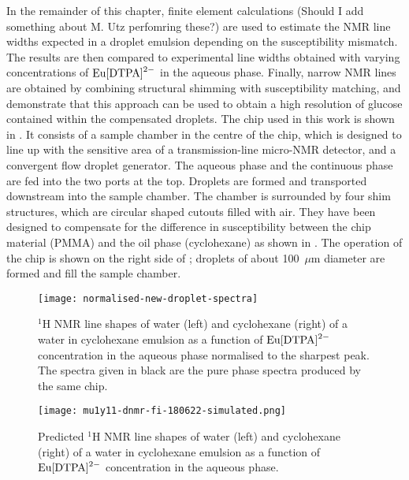 In the remainder of this chapter,
finite element calculations (Should I add something about M. Utz perfomring these?) are used to estimate
the NMR line widths expected in a droplet emulsion
depending on the susceptibility mismatch.
The results are then compared to experimental
line widths obtained with varying concentrations
of $\ce{Eu[DTPA]^{2-}}$ in the aqueous phase. Finally,
 narrow NMR lines are obtained by
combining structural shimming\citep{Ryan:2014hl} with
susceptibility matching, and demonstrate that this
approach can be used to obtain a high resolution of glucose contained within the compensated droplets.
The chip used in this work is shown in . It consists of a sample
chamber in the centre of the chip, which is designed to line up with
the sensitive area of a transmission-line
micro-NMR detector,\citep{Finch:2016gv} and a convergent flow droplet
generator. The aqueous phase and the continuous
phase are fed into the two ports at the top. Droplets are
formed and transported downstream into the sample chamber.
 The chamber is surrounded by four shim structures, which are circular
 shaped cutouts filled with air. They have been designed to compensate
 for the difference in susceptibility between the chip material (PMMA)
 and the oil phase (cyclohexane) as shown in . The operation of the chip is shown
 on the right side of ; droplets of about 100~$\mu$m diameter are formed and
 fill the sample chamber.



\begin{figure}
  \begin{center}
    \texttt{[image: normalised-new-droplet-spectra]}
  \end{center}
  \caption{$^1$H NMR line shapes of water (left) and cyclohexane (right) of a
  water in cyclohexane emulsion as a function of $\ce{Eu[DTPA]^{2-}}$ concentration
  in the aqueous phase normalised to the sharpest peak. The spectra given in black are the pure phase spectra produced by the same chip.
  }
  \label{fig:droplet-spectra}
\end{figure}


\begin{figure}
  \begin{center}
    \texttt{[image: mu1y11-dnmr-fi-180622-simulated.png]}
  \end{center}
  \caption{Predicted $^1$H NMR line shapes of water (left) and cyclohexane (right) of a
  water in cyclohexane emulsion as a function of $\ce{Eu[DTPA]^{2-}}$ concentration
  in the aqueous phase.
  }
  \label{fig:predicted-spectra}
\end{figure}




